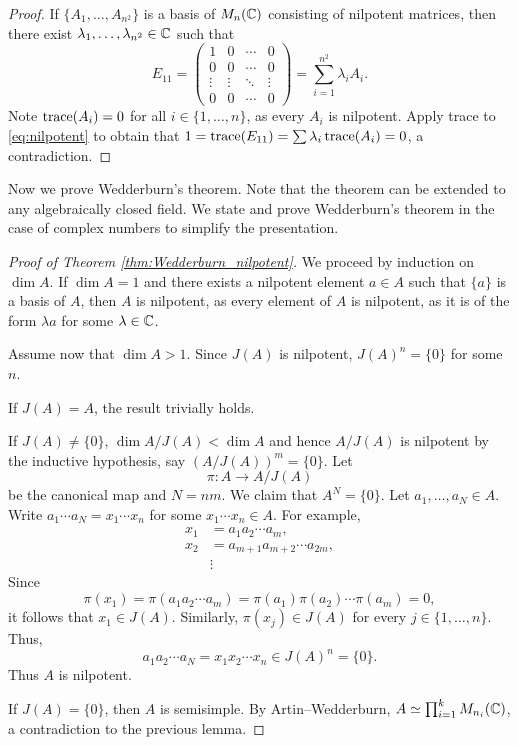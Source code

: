 \begin{proof}
    If $\{A_1,\dots,A_{n^2}\}$ is a basis of 
    $M_n(\mathbb{C})$ consisting of nilpotent matrices, 
    then there exist $\lambda_1,\dots,\lambda_{n^2}\in\mathbb{C}$ such that 
    \begin{equation}
        \label{eq:nilpotent}
        E_{11}=\begin{pmatrix}
        1&0&\cdots&0\\
        0&0&\cdots&0\\
        \vdots&\vdots&\ddots&\vdots\\
        0&0&\cdots&0
        \end{pmatrix}
        =\sum_{i=1}^{n^2}\lambda_iA_i.
    \end{equation}
    Note $\operatorname{trace}(A_i)=0$ for all $i\in\{1,\dots,n\}$, as 
    every $A_i$ is nilpotent. 
    Apply trace to \eqref{eq:nilpotent} to 
    obtain that $1=\operatorname{trace}(E_{11})=\sum\lambda_i\operatorname{trace}(A_i)=0$, a contradiction. 
\end{proof}

Now we prove Wedderburn's theorem. Note that
the theorem can be extended to any algebraically closed field. We 
state and prove Wedderburn's theorem in the case of complex numbers
to simplify the presentation. 

\begin{proof}[Proof of Theorem \ref{thm:Wedderburn_nilpotent}]
    We proceed by induction on $\dim A$. If $\dim A=1$ and 
    there exists a nilpotent element $a\in A$ such that 
    $\{a\}$ is a basis of $A$, then $A$ is nilpotent, 
    as every element of $A$ is nilpotent, as it is 
    of the form 
    $\lambda a$ for some $\lambda\in\mathbb{C}$. 
    
    Assume now that $\dim A>1$. Since $J(A)$ is nilpotent, $J(A)^n=\{0\}$ 
    for some $n$. 
    
    If $J(A)=A$, the result trivially holds. 

    If $J(A)\ne\{0\}$, 
    $\dim A/J(A)<\dim A$ and hence 
    $A/J(A)$ is nilpotent by 
    the inductive hypothesis, 
    say $(A/J(A))^m=\{0\}$. Let \[
    \pi\colon A\to A/J(A)
    \]
    be the canonical map and 
    $N=nm$. We claim that $A^N=\{0\}$. Let $a_1,\dots,a_N\in A$. Write
    $a_1\cdots a_N=x_1\cdots x_n$ for some $x_1\cdots x_n\in A$. For example,
    \begin{align*}
    x_1&=a_1a_2\cdots a_m,\\
    x_2&=a_{m+1}a_{m+2}\cdots a_{2m},\\
    &\vdots
    \end{align*}
    Since 
    \[
    \pi(x_1)=\pi(a_1a_2\cdots a_m)=\pi(a_1)\pi(a_2)\cdots\pi(a_m)=0,
    \]
    it follows that $x_1\in J(A)$. Similarly, 
    $\pi(x_j)\in J(A)$
    for every $j\in\{1,\dots,n\}$. Thus,
    \[
    a_1a_2\cdots a_N=x_1x_2\cdots x_n\in J(A)^n=\{0\}. 
    \]
    Thus $A$ is nilpotent. 

    If $J(A)=\{0\}$, then 
    $A$ is semisimple. By Artin--Wedderburn, 
    $A\simeq\prod_{i=1}^k M_{n_i}(\mathbb{C})$, a contradiction to 
    the previous lemma. 
\end{proof}

